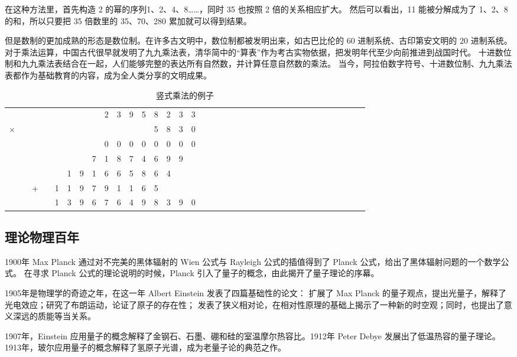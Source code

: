\documentclass[a4paper,12pt]{article}
\begin{document}
在这种方法里，首先构造 2 的幂的序列1、2、4、8……，同时 35 也按照 2 倍的关系相应扩大。
然后可以看出，11 能被分解成为了 1、2、8 的和，所以只要把 35 倍数里的 35、70、280 累加就可以得到结果。

但是数制的更加成熟的形态是数位制。在许多古文明中，数位制都被发明出来，如古巴比伦的 60 进制系统、古印第安文明的 20 进制系统。
对于乘法运算，中国古代很早就发明了九九乘法表，清华简中的“算表”作为考古实物依据，把发明年代至少向前推进到战国时代。
十进数位制和九九乘法表结合在一起，人们能够完整的表达所有自然数，并计算任意自然数的乘法。
当今，阿拉伯数字符号、十进数位制、九九乘法表都作为基础教育的内容，成为全人类分享的文明成果。

\begin{table}[tbhp]
\centering
\begin{tabular}{cccccccccccccccccccccccccccccccccccc}
  &   &   &   &   &   &   &   & 2 & 3 & 9 & 5 & 8 & 2 & 3 & 3\\
× &   &   &   &   &   &   &   &   &   &   &   & 5 & 8 & 3 & 0\\
\hline
  &   &   &   &   &   &   &   & 0 & 0 & 0 & 0 & 0 & 0 & 0 & 0\\
  &   &   &   &   &   &   & 7 & 1 & 8 & 7 & 4 & 6 & 9 & 9 &  \\
  &   &   &   &   & 1 & 9 & 1 & 6 & 6 & 5 & 8 & 6 & 4 &   &  \\
  &   & + &   & 1 & 1 & 9 & 7 & 9 & 1 & 1 & 6 & 5 &   &   &  \\
\hline
  &   &   &   & 1 & 3 & 9 & 6 & 7 & 6 & 4 & 9 & 8 & 3 & 9 & 0\\
\end{tabular}
\caption{竖式乘法的例子}
\end{table}

\subsection{理论物理百年}

1900年 Max Planck 通过对不完美的黑体辐射的 Wien 公式与 Rayleigh 公式的插值得到了 Planck 公式，给出了黑体辐射问题的一个数学公式。
在寻求 Planck 公式的理论说明的时候，Planck 引入了量子的概念，由此揭开了量子理论的序幕。

1905年是物理学的奇迹之年，在这一年 Albert Einstein 发表了四篇基础性的论文：
扩展了 Max Planck 的量子观点，提出光量子，解释了光电效应；研究了布朗运动，论证了原子的存在性；
发表了狭义相对论，在相对性原理的基础上揭示了一种新的时空观；同时，也提出了意义深远的质能等当关系。

1907年，Einstein 应用量子的概念解释了金钢石、石墨、硼和硅的室温摩尔热容比。1912年 Peter Debye 发展出了低温热容的量子理论。
1913年，玻尔应用量子的概念解释了氢原子光谱，成为老量子论的典范之作。
\end{document}
